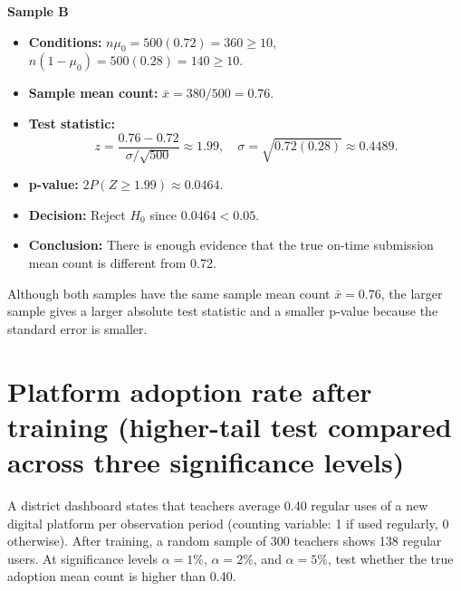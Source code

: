 \begin{center}
\end{center}


\textbf{Sample B}

\begin{itemize}
	\item \textbf{Conditions:} \(n\mu_0=500(0.72)=360\ge10\), \(n(1-\mu_0)=500(0.28)=140\ge10\).
	\item \textbf{Sample mean count:} \(\bar x=380/500=0.76\).
	\item \textbf{Test statistic:}
	\[
	z=\frac{0.76-0.72}{\sigma/\sqrt{500}}\approx 1.99,\quad \sigma=\sqrt{0.72(0.28)}\approx0.4489.
	\]
	\item \textbf{p-value:} \(2P(Z\ge 1.99)\approx 0.0464\).
	\item \textbf{Decision:} Reject \(H_0\) since \(0.0464<0.05\).
	\item \textbf{Conclusion:} There is enough evidence that the true on-time submission mean count is different from 0.72.
\end{itemize}

\begin{center}
\end{center}


Although both samples have the same sample mean count \(\bar x=0.76\), the larger sample gives a larger absolute test statistic and a smaller p-value because the standard error is smaller.

\section{Platform adoption rate after training (higher-tail test compared across three significance levels)}
A district dashboard states that teachers average 0.40 regular uses of a new digital platform per observation period (counting variable: 1 if used regularly, 0 otherwise). After training, a random sample of 300 teachers shows 138 regular users. At significance levels \(\alpha=1\%\), \(\alpha=2\%\), and \(\alpha=5\%\), test whether the true adoption mean count is higher than 0.40.

